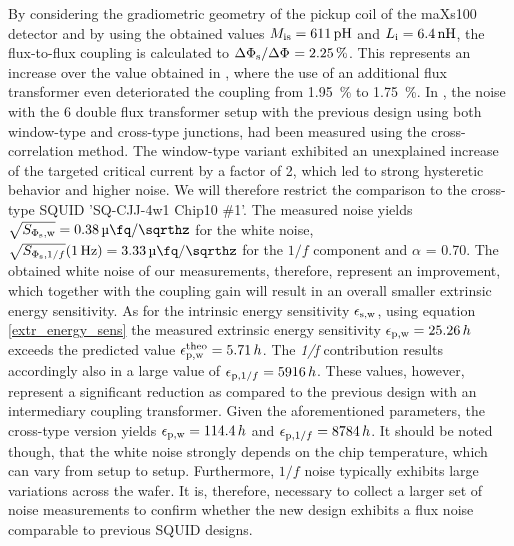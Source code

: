 By considering the gradiometric geometry of the pickup coil of the maXs100 detector and by using the obtained values $M_{\rm is}=\qty{611}{\pH}$ and  $L_{\rm i}=\qty{6.4}{\nH}$, the flux-to-flux coupling is calculated to $\Delta\Phi_{\rm s}/\Delta\Phi_{\rm }=\qty{2.25}{\percent}$. This represents an increase over the value obtained in \cite{Bauer2022}, where the use of an additional flux transformer even deteriorated the coupling from \qty{1.95}{\percent} to \qty{1.75}{\percent}. In \cite{Bauer2022}, the noise with the \qty{6}{\nH} double flux transformer setup with the previous design using both window-type and cross-type junctions, had been measured using the cross-correlation method. The window-type variant exhibited an unexplained increase of the targeted critical current by a factor of 2, which led to strong hysteretic behavior and higher noise. We will therefore restrict the comparison to the cross-type SQUID 'SQ-CJJ-4w1 Chip10 $\#$1'. The measured noise yields $\sqrt{S_{\rm \Phi_{\rm s},w}}=\qty{0.38}{\micro\fq\per\sqrthz}$ for the white noise, $\sqrt{S_{\Phi_{\rm s},1/f}}(\qty{1}{\Hz})=\qty{3.33}{\micro\fq\per\sqrthz}$ for the $1/f$ component and $\alpha$ = 0.70. The obtained white noise of our measurements, therefore, represent an improvement, which together with the coupling gain will result in an overall smaller extrinsic energy sensitivity. As for the intrinsic energy sensitivity $\epsilon_{\rm s,w}$,  using equation \ref{extr_energy_sens} the measured extrinsic energy sensitivity $\epsilon_{\rm p,w}=25.26\, h$ exceeds the predicted value $\epsilon_{\rm p,w}^{\rm theo}=5.71\, h$. The \textit{1/f} contribution results accordingly also in a large value of $\epsilon_{{\rm p},1/f}=5916\, h$. These values, however, represent a significant reduction as compared to the previous design with an intermediary coupling transformer. Given the aforementioned parameters, the cross-type version yields $\epsilon_{\rm p,w}=114.4\, h$ and $\epsilon_{{\rm p},1/f}=8784\, h$. It should be noted though, that the white noise strongly depends on the chip temperature, which can vary from setup to setup. Furthermore, $1/f$ noise typically exhibits large variations across the wafer. It is, therefore, necessary to collect a larger set of noise measurements to confirm whether the new design exhibits a flux noise comparable to previous SQUID designs.

